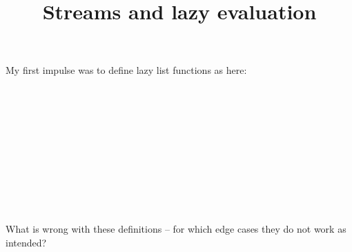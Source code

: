 \documentclass{article}
\begin{document}
{}

{\title{Streams and lazy evaluation}}

\begin{exercise}
  My first impulse was to define lazy list functions as here:
  
  \\
  {}{}{\hlopt{=
  }}{}{\hlendline{}}\\
  {\hlstd{ {\hlopt{\textbar}} }}{}{\hlopt{, }}{}{\hlopt{-> }}{}{\hlendline{}}\\
  {\hlstd{ {\hlopt{\textbar}} }}{}{\hlopt{(}}{}{\hlopt{, }}{}{}{\hlopt{),
  }}{}{\hlopt{(}}{}{\hlopt{, }}{}{}{\hlopt{) ->}}{\hlendline{}}\\
  {\hlstd{ \ \ \ \ }}{}{\hlopt{((}}{}{\hlopt{,
  }}{}{\hlopt{), }}{}{\hlopt{(}}{}{\hlopt{(}}{}{\hlopt{,
  }}{}{\hlopt{)))}}{\hlendline{}}\\
  {\hlstd{ {\hlopt{\textbar}} {\textunderscore} }}{\hlopt{-> }}{}{\hlopt{(}}{}{}{\hlopt{)}}{\hlendline{}}\\
  {\hlendline{}}\\
  {}{}{\hlopt{=
  }}{}{\hlendline{}}\\
  {\hlstd{ {\hlopt{\textbar}} }}{}{\hlopt{->
  }}{}{\hlendline{}}\\
  {\hlstd{ {\hlopt{\textbar}} }}{}{\hlopt{(}}{}{\hlopt{, }}{}{}{\hlopt{) ->
  }}{}{\hlopt{(}}{}{\hlopt{, }}{}{\hlopt{(}}{}{\hlopt{))}}{\hlendline{}}\\
  
  
  What is wrong with these definitions -- for which edge cases they do not
  work as intended?
\end{exercise}
\end{document}
